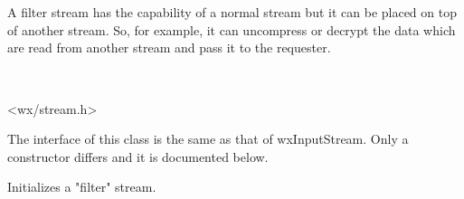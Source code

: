 \section{}\label{wxfilterinputstream}

A filter stream has the capability of a normal stream but it can be placed on top
of another stream. So, for example, it can uncompress or decrypt the data which are read
from another stream and pass it to the requester.


\\


<wx/stream.h>


The interface of this class is the same as that of wxInputStream. Only a constructor
differs and it is documented below.


\label{wxfilterinputstreamctor}


Initializes a "filter" stream.

